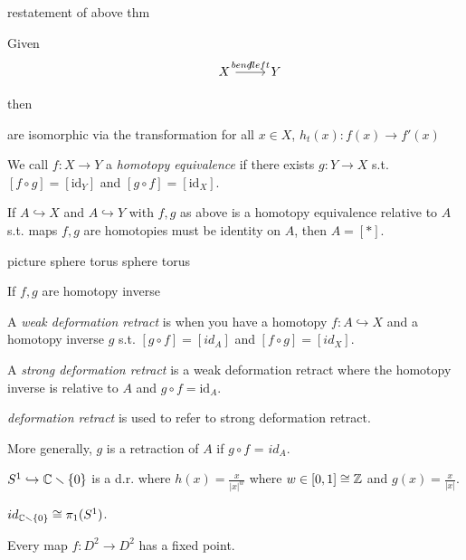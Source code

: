 \documentclass[11pt,leqno,oneside]{amsart}
\numberwithin{thm}{section}
\newcommand{\of}{\circ}
\newcommand{\minus}{\smallsetminus}
\newcommand{\fund}{\pi_1}
\newcommand{\into}{\hookrightarrow}
\newcommand{\id}{\text{id}}
\newcommand{\de}{\emph}
\begin{document}
\begin{thm}
  restatement of above thm

  Given
  $$\begin{tikzcd}
    &X \arrow[r, "f", "bend left"] &Y %
  \end{tikzcd}$$

  then



  are isomorphic  via the transformation
  for all $x \in X$, $h_t(x)\colon f(x) \to f'(x)$
\end{thm}
\begin{defn}
  We call $f:X \to Y$ a \de{homotopy equivalence} if there exists $g\colon Y \to X$ s.t. $[f \of g] = [\id_Y]$ and $[g \of f] = [\id_X]$.
\end{defn}
\begin{rmk}
  If $A \into X$ and $A \into Y$ with $f,g$ as above is a homotopy equivalence relative to $A$ s.t. maps $f,g$ are homotopies must be identity on $A$, then $A = [*]$.

  picture
  sphere torus
  sphere torus

  If $f,g$ are homotopy inverse

\end{rmk}
\begin{defn}
  A \de{weak deformation retract} is when you have a homotopy $f: A \into X$ and a homotopy inverse $g$ s.t. $[g \of f] = [id_A]$ and $[f \of g] = [id_X]$.
\end{defn}
\begin{defn}
  A \de{strong deformation retract} is a weak deformation retract where the homotopy inverse is relative to $A$ and $g \of f = \id_A$.
\end{defn}
\begin{rmk}
  \de{deformation retract} is used to refer to strong deformation retract.
\end{rmk}
\begin{rmk}
  More generally, $g$ is a retraction of $A$ if $g \of f$ = $id_A$.
\end{rmk}
\begin{example}
  $S^1 \into \C\minus\{0\}$ is a d.r. where $h(x) = \frac{x}{|x|^w}$ where $w \in [0,1] \mathrel{\cong} {\mathbb Z}$  and $g(x) = \frac{x}{|x|}$.

  $id_{\C\minus\{0\}} \isom \fund(S^1)$.
\end{example}
\begin{thm}
  Every map $f\colon D^2 \to D^2$ has a fixed point.
\end{thm}
\end{document}

